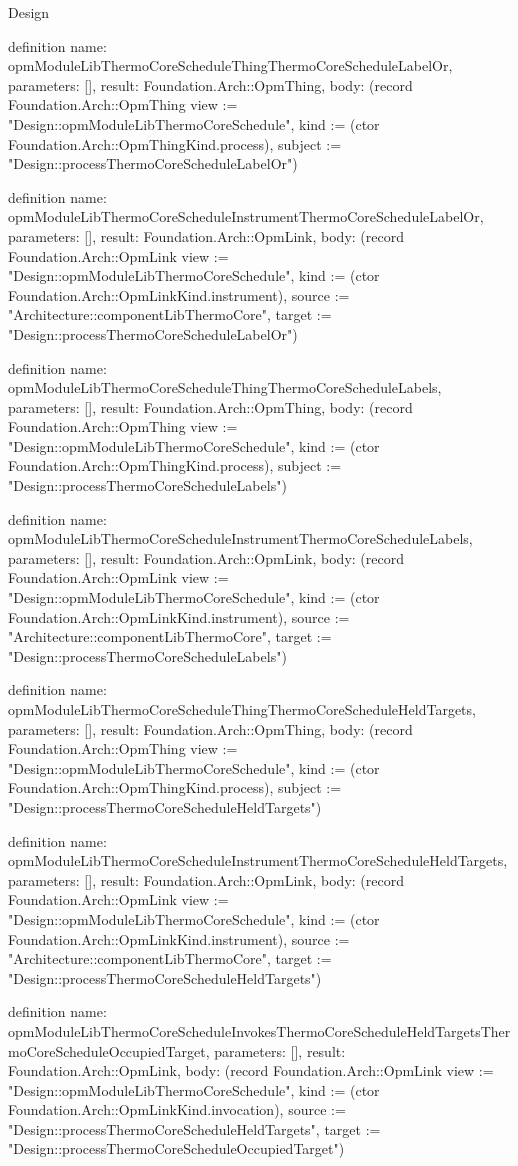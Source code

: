 \begin{lexlean}{Design}
\begin{semanticmodule}
definition{
  name: opmModuleLibThermoCoreScheduleThingThermoCoreScheduleLabelOr,
  parameters: [],
  result: Foundation.Arch::OpmThing,
  body: (record Foundation.Arch::OpmThing {view := "Design::opmModuleLibThermoCoreSchedule", kind := (ctor Foundation.Arch::OpmThingKind.process), subject := "Design::processThermoCoreScheduleLabelOr"})
}

definition{
  name: opmModuleLibThermoCoreScheduleInstrumentThermoCoreScheduleLabelOr,
  parameters: [],
  result: Foundation.Arch::OpmLink,
  body: (record Foundation.Arch::OpmLink {view := "Design::opmModuleLibThermoCoreSchedule", kind := (ctor Foundation.Arch::OpmLinkKind.instrument), source := "Architecture::componentLibThermoCore", target := "Design::processThermoCoreScheduleLabelOr"})
}

definition{
  name: opmModuleLibThermoCoreScheduleThingThermoCoreScheduleLabels,
  parameters: [],
  result: Foundation.Arch::OpmThing,
  body: (record Foundation.Arch::OpmThing {view := "Design::opmModuleLibThermoCoreSchedule", kind := (ctor Foundation.Arch::OpmThingKind.process), subject := "Design::processThermoCoreScheduleLabels"})
}

definition{
  name: opmModuleLibThermoCoreScheduleInstrumentThermoCoreScheduleLabels,
  parameters: [],
  result: Foundation.Arch::OpmLink,
  body: (record Foundation.Arch::OpmLink {view := "Design::opmModuleLibThermoCoreSchedule", kind := (ctor Foundation.Arch::OpmLinkKind.instrument), source := "Architecture::componentLibThermoCore", target := "Design::processThermoCoreScheduleLabels"})
}

definition{
  name: opmModuleLibThermoCoreScheduleThingThermoCoreScheduleHeldTargets,
  parameters: [],
  result: Foundation.Arch::OpmThing,
  body: (record Foundation.Arch::OpmThing {view := "Design::opmModuleLibThermoCoreSchedule", kind := (ctor Foundation.Arch::OpmThingKind.process), subject := "Design::processThermoCoreScheduleHeldTargets"})
}

definition{
  name: opmModuleLibThermoCoreScheduleInstrumentThermoCoreScheduleHeldTargets,
  parameters: [],
  result: Foundation.Arch::OpmLink,
  body: (record Foundation.Arch::OpmLink {view := "Design::opmModuleLibThermoCoreSchedule", kind := (ctor Foundation.Arch::OpmLinkKind.instrument), source := "Architecture::componentLibThermoCore", target := "Design::processThermoCoreScheduleHeldTargets"})
}

definition{
  name: opmModuleLibThermoCoreScheduleInvokesThermoCoreScheduleHeldTargetsThermoCoreScheduleOccupiedTarget,
  parameters: [],
  result: Foundation.Arch::OpmLink,
  body: (record Foundation.Arch::OpmLink {view := "Design::opmModuleLibThermoCoreSchedule", kind := (ctor Foundation.Arch::OpmLinkKind.invocation), source := "Design::processThermoCoreScheduleHeldTargets", target := "Design::processThermoCoreScheduleOccupiedTarget"})
}


\end{semanticmodule}
\end{lexlean}
